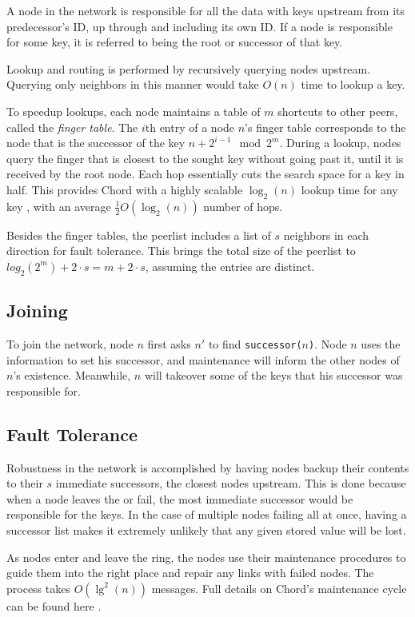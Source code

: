 A node in the network is responsible for all the data with keys upstream from its predecessor's ID, up through and including its own ID.  
If a node is responsible for some key, it is referred to being the root or successor of that key.

Lookup and routing is performed by recursively querying nodes upstream.
Querying only neighbors in this manner would take $O(n)$ time to lookup a key.


To speedup lookups, each node maintains a table of $m$ shortcuts to other peers, called the \textit{finger table}.
The $i$th entry of a node $n$'s finger table corresponds to the node that is the successor of the key $n+2^{i-1} \mod 2^m $.  
During a lookup,  nodes query the finger that is closest to the sought key without going past it, until it is received by the root node.
Each hop essentially cuts the search space for a key in half.
This provides Chord with a highly scalable $\log_2(n)$ lookup time for any key \cite{chord}, with an average $\frac{1}{2}O(\log_{2}(n))$ number of hops.

Besides the finger tables, the peerlist includes a list of $s$ neighbors in each direction for fault tolerance.
This brings the total size of the peerlist to $log_{2}(2^{m})  + 2 \cdot s =  m  + 2 \cdot s$, assuming the entries are distinct.

\subsection*{Joining}
To join the network, node $n$ first asks $n'$ to find \texttt{successor($ n $)}. 
Node $n$ uses the information to set his successor, and maintenance will inform the other nodes of $n$'s existence.
Meanwhile, $n$ will takeover some of the keys that his successor was responsible for.

\subsection*{Fault Tolerance}
Robustness in the network is accomplished by having nodes backup their contents to their $s$ immediate successors, the closest nodes upstream. 
This is done because when a node leaves the or fail, the most immediate successor would be responsible for the keys.
In the case of multiple nodes failing all at once, having a successor list makes it extremely unlikely that any given stored value will be lost.

As nodes enter and leave the ring, the nodes use their maintenance procedures to guide them into the right place and repair any links with failed nodes.  
The process takes $O(\lg^{2}(n))$ messages.
Full details on Chord's maintenance cycle can be found here \cite{chord}.

